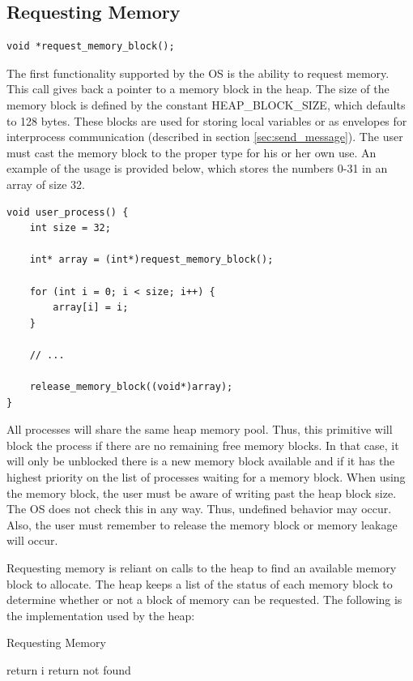 \documentclass[12pt]{report}
\begin{document}
\subsection{Requesting Memory}
\label{sec:request_memory}
\begin{lstlisting}
void *request_memory_block();
\end{lstlisting}
\par The first functionality supported by the OS is the ability to request memory. This call gives back a pointer to a memory block in the heap. The size of the memory block is defined by the constant HEAP\_BLOCK\_SIZE, which defaults to 128 bytes. These blocks are used for storing local variables or as envelopes for interprocess communication (described in section \ref{sec:send_message}). The user must cast the memory block to the proper type for his or her own use. An example of the usage is provided below, which stores the numbers 0-31 in an array of size 32.
\begin{lstlisting}
void user_process() {
    int size = 32;

    int* array = (int*)request_memory_block();

    for (int i = 0; i < size; i++) {
        array[i] = i;
    }

    // ...

    release_memory_block((void*)array);
}
\end{lstlisting}

\par All processes will share the same heap memory pool. Thus, this primitive will block the process if there are no remaining free memory blocks. In that case, it will only be unblocked there is a new memory block available and if it has the highest priority on the list of processes waiting for a memory block. When using the memory block, the user must be aware of writing past the heap block size. The OS does not check this in any way. Thus, undefined behavior may occur. Also, the user must remember to release the memory block or memory leakage will occur.

\par Requesting memory is reliant on calls to the heap to find an available memory block to allocate. The heap keeps a list of the status of each memory block to determine whether or not a block of memory can be requested. The following is the implementation used by the heap:
\label{fig:findfreeblock}
\begin{algorithm}
  \caption{Requesting Memory}
  \begin{algorithmic}[1]
          \State return i
        \EndIf
      \EndFor
    \State return not found
    \EndFunction
  \end{algorithmic}
\end{algorithm}
\end{document}
